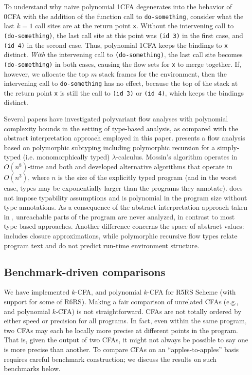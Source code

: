 To understand why naive polynomial 1CFA degenerates into the behavior of 0CFA with
the addition of the function call to {\tt do-something}, consider
what the last $k=1$ call sites are at the return point {\tt x}.
Without the intervening call to {\tt (do-something)}, the last call
site at this point was {\tt (id 3)} in the first case, and {\tt
  (id 4)} in the second case.
Thus, polynomial 1CFA keeps the bindings to {\tt x} distinct.
\emph{With} the intervening call to {\tt (do-something)}, the last 
call site becomes {\tt (do-something)} in both cases, causing
the flow sets for {\tt x} to merge together.
If, however, we allocate the top $m$ stack frames for the
environment, then the intervening call to {\tt do-something} has no
effect, because the top of the stack at the return point {\tt x} is
still the call to {\tt (id 3)} or {\tt (id 4)}, which keeps the
bindings distinct.





Several papers have investigated polyvariant flow analyses with
polynomial complexity bounds in the setting of type-based analysis, as
compared with the abstract interpretation approach employed in this
paper.
\citet{dvanhorn:Mossin:97:FlowAnalysis} presents a flow analysis based
on polymorphic subtyping including polymorphic recursion for a
simply-typed (i.e. monomorphically typed) $\lambda$-calculus.
Mossin's algorithm operates in $O(n^8)$-time and both
\citet{dvanhorn:Rehof:POPL01} and \citet{dvanhorn:Gustavsson:PADO01}
developed alternative algorithms that operate in $O(n^3)$, where $n$
is the size of the explicitly typed program (and in the worst case,
types may be exponentially larger than the programs they annotate).
\nCFA{} does not impose typability assumptions and is polynomial in
the program size without type annotations.
As a consequence of the abstract interpretation approach taken in
\nCFA{}, unreachable parts of the program are never analyzed,
in contrast to most type based approaches.
Another difference concerns the space of abstract values: \nCFA{}
includes closure approximations, while polymorphic recursive flow
types relate program text and do not predict run-time environment
structure.

\subsection{Benchmark-driven comparisons}

We have implemented $k$-CFA, \nCFA{} and polynomial $k$-CFA for R5RS
Scheme (with support for some of R6RS).
Making a fair comparison of unrelated CFAs (e.g., \nCFA{} and
polynomial $k$-CFA) is not straightforward.
CFAs are not totally ordered by either speed or precision for all
programs.
In fact, even within the same program, two CFAs may each be locally
more precise at different points in the program.
That is, given the output of two CFAs, it might not always be possible
to say one is more precise than another.
To compare CFAs on an ``apples-to-apples'' basis requires careful
benchmark construction; we discuss the results on such benchmarks
below.



